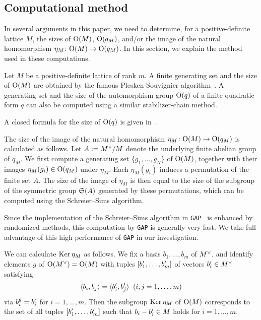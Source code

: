 \documentclass{amsart} %
\begin{document}
\subsection{Computational method}\label{subsec:computational}
%
In several arguments in this paper, 
we need to determine, for a positive-definite lattice $M$,  the sizes of $\mathord{\mathrm{O}}(M)$,
$\mathord{\mathrm{O}}(q_M)$, and/or 
the image of the natural homomorphism
$\eta_M\colon \mathord{\mathrm{O}}(M) \to \mathord{\mathrm{O}}(q_M)$.
In this section, we explain the method used in these computations.
%
\par
%
Let $M$ be a positive-definite lattice of rank $m$.
A finite generating set 
and the size of $\mathord{\mathrm{O}}(M)$ are obtained by the famous Plesken-Souvignier algorithm~\cite{MR1484483}.
A generating set and the size of the automorphism group $\mathord{\mathrm{O}}(q)$ of a finite quadratic form 
$q$ can also be computed using a similar stabilizer-chain method.
%
\begin{remark}
A closed formula for the size of $\mathord{\mathrm{O}}(q)$ is given in~\cite[Theorem 5.2]{MR4730253}.
\end{remark}
%
%
The size of the image of 
the natural homomorphism $\eta_M\colon \mathord{\mathrm{O}}(M)\to \mathord{\mathrm{O}}(q_M)$ is calculated as follows.
Let $A:=M^{\vee}/M$ denote the underlying finite abelian group of $q_M$.
We first compute a generating set $\{g_1, \dots, g_N\}$ of $\mathord{\mathrm{O}}(M)$,
together with their images $\eta_M(g_i)\in \mathord{\mathrm{O}}(q_M)$ under $\eta_M$.
Each $\eta_M(g_i)$ induces a permutation of the finite set $A$.
The size of the image of $\eta_M$ is 
then equal to the size of the subgroup of 
the symmetric group $\mathord{\mathfrak{S}}(A)$ generated by these permutations,
which can be computed using the Schreier--Sims algorithm.
%
\begin{remark}\label{rem:GAPadvantage}
Since the implementation of the Schreier--Sims algorithm in {\tt GAP}~\cite{GAP4} is enhanced by randomized methods,
this computation by {\tt GAP} is generally very fast.
We take full advantage of this high performance of {\tt GAP} in our investigation.
\end{remark}
%
We can calculate  $\operatorname{Ker} \eta_M$
as follows.
We fix a basis 
$b_1, \dots, b_{m}$ of $M^{\vee}$, 
and identify elements $g$ of $\mathord{\mathrm{O}}(M^{\vee})=\mathord{\mathrm{O}}(M)$
with tuples $[b_1^{\prime}, \dots, b_{m}^{\prime}]$ of vectors 
$b_i^{\prime}\in M^{\vee}$
satisfying
\[
\langle b_i, b_j \rangle=\langle b_i^{\prime}, b_j^{\prime} \rangle \;\;(i, j=1, \dots, m)
\]
via $b_i^g=b_i^{\prime}$ for $i=1, \dots, m$.
Then 
the subgroup
$\operatorname{Ker} \eta_M$ of $\mathord{\mathrm{O}}(M)$
corresponds to the set of 
all tuples $[b_1^{\prime}, \dots, b_{m}^{\prime}]$
such that $b_i-b_i^{\prime}\in M$ holds for $i=1, \dots, m$.
\end{document}
